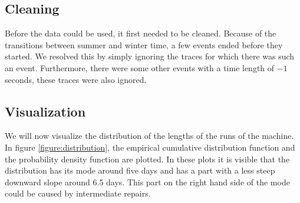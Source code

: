 \documentclass[a4paper]{thesis}
\theoremstyle{definition}
\begin{document}
\subsection{Cleaning}
Before the data could be used, it first needed to be cleaned.
Because of the transitions between summer and winter time, a few events ended before they started.
We resolved this by simply ignoring the traces for which there was such an event.
Furthermore, there were some other events with a time length of $-1$ seconds, these traces were also ignored.

\subsection{Visualization}
We will now visualize the distribution of the lengths of the runs of the machine.
In figure \ref{figure:distribution}, the empirical cumulative distribution function and the probability density function are plotted.
In these plots it is visible that the distribution has its mode around five days and has a part with a less steep downward slope around 6.5 days.
This part on the right hand side of the mode could be caused by intermediate repairs.
\end{document}
